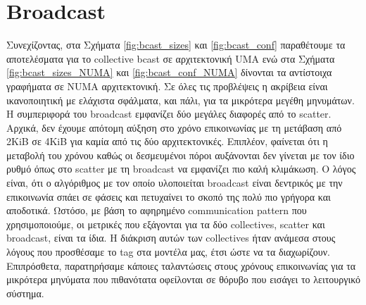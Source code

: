 \section{Broadcast}
Συνεχίζοντας, στα Σχήματα \ref{fig:bcast_sizes} και \ref{fig:bcast_conf} παραθέτουμε τα αποτελέσματα για το collective bcast σε αρχιτεκτονική UMA ενώ στα Σχήματα \ref{fig:bcast_sizes_NUMA} και \ref{fig:bcast_conf_NUMA} δίνονται τα αντίστοιχα γραφήματα σε NUMA αρχιτεκτονική. Σε όλες τις προβλέψεις η ακρίβεια είναι ικανοποιητική με ελάχιστα σφάλματα, και πάλι, για τα μικρότερα μεγέθη μηνυμάτων. Η συμπεριφορά του broadcast εμφανίζει δύο μεγάλες διαφορές από το scatter. Αρχικά, δεν έχουμε απότομη αύξηση στο χρόνο επικοινωνίας με τη μετάβαση από 2KiB σε 4KiB για καμία από τις δύο αρχιτεκτονικές. Επιπλέον, φαίνεται ότι η μεταβολή του χρόνου καθώς οι δεσμευμένοι πόροι αυξάνονται δεν γίνεται με τον ίδιο ρυθμό όπως στο scatter με τη broadcast να εμφανίζει πιο καλή κλιμάκωση. Ο λόγος είναι, ότι ο αλγόριθμος με τον οποίο υλοποιείται broadcast είναι δεντρικός με την επικοινωνία σπάει σε φάσεις και πετυχαίνει το σκοπό της πολύ πιο γρήγορα και αποδοτικά. Ωστόσο, με βάση το αφηρημένο communication pattern που χρησιμοποιούμε, οι μετρικές που εξάγονται για τα δύο collectives, scatter και broadcast, είναι τα ίδια. Η διάκριση αυτών των collectives ήταν ανάμεσα στους λόγους που προσθέσαμε το tag στα μοντέλα μας, έτσι ώστε να τα διαχωρίζουν. Επιπρόσθετα, παρατηρήσαμε κάποιες ταλαντώσεις στους χρόνους επικοινωνίας για τα μικρότερα μηνύματα που πιθανότατα οφείλονται σε θόρυβο που εισάγει το λειτουργικό σύστημα. 
